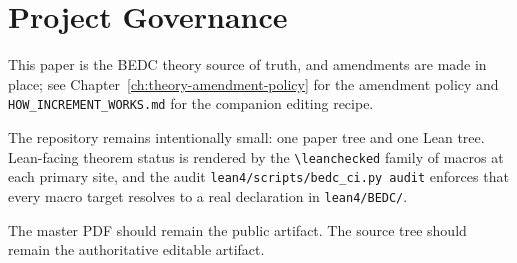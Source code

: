 \chapter{Project Governance}
\label{ch:project-governance}

This paper is the BEDC theory source of truth, and amendments are made in place; see Chapter~\ref{ch:theory-amendment-policy} for the amendment policy and \texttt{HOW\_INCREMENT\_WORKS.md} for the companion editing recipe.

The repository remains intentionally small: one paper tree and one Lean tree. Lean-facing theorem status is rendered by the \texttt{\textbackslash leanchecked} family of macros at each primary site, and the audit \texttt{lean4/scripts/bedc\_ci.py audit} enforces that every macro target resolves to a real declaration in \texttt{lean4/BEDC/}.

\begin{remark}
The master PDF should remain the public artifact. The source tree should remain the authoritative editable artifact.
\end{remark}
